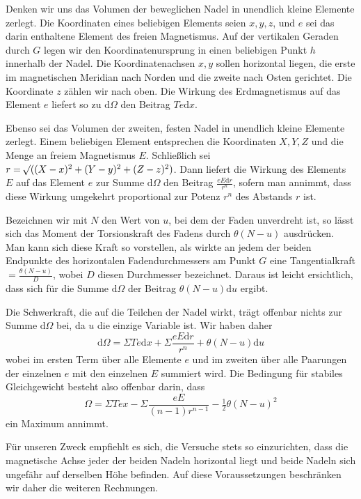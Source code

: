 Denken wir uns das Volumen der beweglichen Nadel in unendlich kleine Elemente zerlegt. Die Koordinaten eines beliebigen Elements seien $x,y,z$, und $e$ sei das darin enthaltene Element des freien Magnetismus. Auf der vertikalen Geraden durch $G$ legen wir den Koordinatenursprung in einen beliebigen Punkt $h$ innerhalb der Nadel. Die Koordinatenachsen $x,y$ sollen horizontal liegen, die erste im magnetischen Meridian nach Norden und die zweite nach Osten gerichtet. Die Koordinate $z$ zählen wir nach oben. Die Wirkung des Erdmagnetismus auf das Element $e$ liefert so zu $\mathrm{d}\Omega$ den Beitrag $Te\mathrm{d}x$.

Ebenso sei das Volumen der zweiten, festen Nadel in unendlich kleine Elemente zerlegt. Einem beliebigen Element entsprechen die Koordinaten $X,Y,Z$ und die Menge an freiem Magnetismus $E$. Schließlich sei $r=\mathord{{}^{}\!\surd}((X-x)^2+(Y-y)^2+(Z-z)^2)$. Dann liefert die Wirkung des Elements $E$ auf das Element $e$ zur Summe $\mathrm{d}\Omega$ den Beitrag $\frac{eE\mathrm{d}r}{r^n}$, sofern man annimmt, dass diese Wirkung umgekehrt proportional zur Potenz $r^n$ des Abstands $r$ ist.

Bezeichnen wir mit $N$ den Wert von $u$, bei dem der Faden unverdreht ist, so lässt sich das Moment der Torsionskraft des Fadens durch $\theta(N-u)$ ausdrücken. Man kann sich diese Kraft so vorstellen, als wirkte an jedem der beiden Endpunkte des horizontalen Fadendurchmessers am Punkt $G$ eine Tangentialkraft $=\frac{\theta(N-u)}{D}$, wobei $D$ diesen Durchmesser bezeichnet. Daraus ist leicht ersichtlich, dass sich für die Summe $\mathrm{d}\Omega$ der Beitrag $\theta(N-u)\mathrm{d}u$ ergibt.

Die Schwerkraft, die auf die Teilchen der Nadel wirkt, trägt offenbar nichts zur Summe $\mathrm{d}\Omega$ bei, da $u$ die einzige Variable ist. Wir haben daher
\[
\mathrm{d}\Omega=\Sigma Te\mathrm{d}x+\Sigma\frac{eE\mathrm{d}r}{r^n}+\theta(N-u)\mathrm{d}u
\]
wobei im ersten Term über alle Elemente $e$ und im zweiten über alle Paarungen der einzelnen $e$ mit den einzelnen $E$ summiert wird. Die Bedingung für stabiles Gleichgewicht besteht also offenbar darin, dass
\[
\Omega=\Sigma Tex-\Sigma\frac{eE}{(n-1)r^{n-1}}-\tfrac12\theta(N-u)^2
\]
ein Maximum annimmt.

Für unseren Zweck empfiehlt es sich, die Versuche stets so einzurichten, dass die magnetische Achse jeder der beiden Nadeln horizontal liegt und beide Nadeln sich ungefähr auf derselben Höhe befinden. Auf diese Voraussetzungen beschränken wir daher die weiteren Rechnungen.

